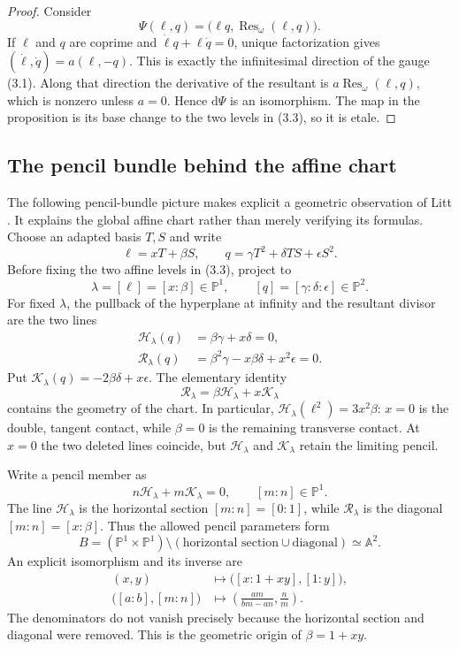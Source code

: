 \documentclass[11pt,a4paper]{article}
\theoremstyle{remark}
\DeclareMathOperator{\Res}{Res}
\newcommand{\A}{\mathbb A}
\newcommand{\PP}{\mathbb P}
\newcommand{\dd}{\mathrm d}
\begin{document}
\begin{proof}
Consider
\[
\Psi(\ell,q)=\bigl(\ell q,\Res_\omega(\ell,q)\bigr).
\]
If $\ell$ and $q$ are coprime and
$\dot\ell q+\ell\dot q=0$, unique factorization gives
$(\dot\ell,\dot q)=a(\ell,-q)$.  This is exactly the infinitesimal direction
of the gauge (3.1).  Along that direction the derivative of the resultant is
$a\Res_\omega(\ell,q)$, which is nonzero unless $a=0$.  Hence $\dd\Psi$ is an
isomorphism.  The map in the proposition is its base change to the two levels
in (3.3), so it is etale.
\end{proof}

\subsection*{The pencil bundle behind the affine chart}

The following pencil-bundle picture makes explicit a geometric observation
of Litt \cite{LittBundle}.  It explains the global affine chart rather than
merely verifying its formulas.  Choose an adapted basis $T,S$ and write
\[
  \ell=xT+\beta S,\qquad
  q=\gamma T^2+\delta TS+\epsilon S^2.
\]
Before fixing the two affine levels in (3.3), project to
\[
  \lambda=[\ell]=[x:\beta]\in\PP^1,
  \qquad [q]=[\gamma:\delta:\epsilon]\in\PP^2.
\]
For fixed $\lambda$, the pullback of the hyperplane at infinity and the resultant
divisor are the two lines
\begin{align*}
  \mathcal H_\lambda(q)&=\beta\gamma+x\delta=0,\\
  \mathcal R_\lambda(q)&=\beta^2\gamma-x\beta\delta+x^2\epsilon=0.
\end{align*}
Put $\mathcal K_\lambda(q)=-2\beta\delta+x\epsilon$.  The elementary identity
\[
  \mathcal R_\lambda=\beta\mathcal H_\lambda+x\mathcal K_\lambda
\]
contains the geometry of the chart.  In particular,
$\mathcal H_\lambda(\ell^2)=3x^2\beta$: $x=0$ is the double, tangent
contact, while $\beta=0$ is the remaining transverse contact.  At $x=0$ the
two deleted lines coincide, but $\mathcal H_\lambda$ and
$\mathcal K_\lambda$ retain the limiting pencil.

Write a pencil member as
\[
  n\mathcal H_\lambda+m\mathcal K_\lambda=0,
  \qquad [m:n]\in\PP^1.
\]
The line $\mathcal H_\lambda$ is the horizontal section $[m:n]=[0:1]$, while
$\mathcal R_\lambda$ is the diagonal $[m:n]=[x:\beta]$.  Thus the allowed pencil
parameters form
\[
  B=(\PP^1\times\PP^1)
  \setminus(\text{horizontal section}\cup\text{diagonal})
  \simeq\A^2.
\]
An explicit isomorphism and its inverse are
\begin{align*}
  (x,y)&\longmapsto\bigl([x:1+xy],[1:y]\bigr),\\
  \bigl([a:b],[m:n]\bigr)&\longmapsto
  \left(\frac{am}{bm-an},\frac nm\right).
\end{align*}
The denominators do not vanish precisely because the horizontal section and
diagonal were removed.  This is the geometric origin of $\beta=1+xy$.
\end{document}
